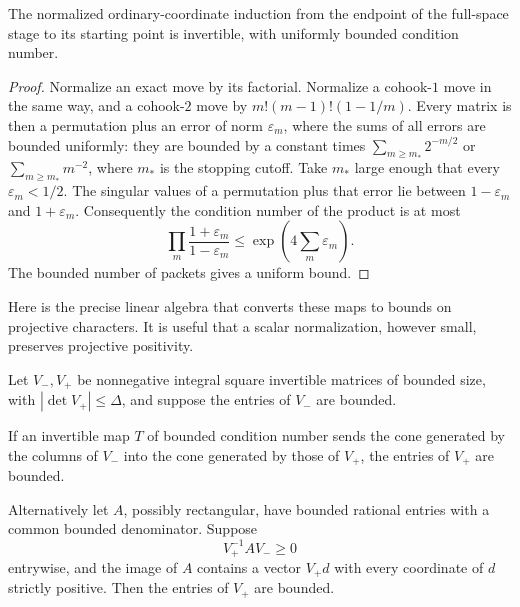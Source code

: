 \begin{lemma}\label{run:condition}
The normalized ordinary-coordinate induction from the endpoint
of the full-space stage to its starting point is invertible,
with uniformly bounded condition number.
\end{lemma}

\begin{proof}
Normalize an exact move by its factorial.  Normalize a
cohook-\(1\) move in the same way, and a cohook-\(2\) move
by \(m!(m-1)!(1-1/m)\).
Every matrix is then a permutation plus an error of norm
\(\varepsilon_m\), where the sums of all errors are bounded
uniformly: they are bounded by a constant times
\(\sum_{m\geq m_*}2^{-m/2}\) or
\(\sum_{m\geq m_*}m^{-2}\), where \(m_*\) is the stopping cutoff.
Take \(m_*\) large enough that every \(\varepsilon_m<1/2\).
The singular values of a permutation plus that error lie
between \(1-\varepsilon_m\) and \(1+\varepsilon_m\).
Consequently the condition number of the product is at most
\[
 \prod_m\frac{1+\varepsilon_m}{1-\varepsilon_m}
 \leq \exp\!\left(4\sum_m\varepsilon_m\right).
 \]
The bounded number of packets gives a uniform bound.
\end{proof}

Here is the precise linear algebra that converts these maps to
bounds on projective characters.  It is useful that a scalar
normalization, however small, preserves projective positivity.

\begin{lemma}\label{run:cone-transfer}
Let \(V_-,V_+\) be nonnegative integral square invertible
matrices of bounded size, with
\(|\det V_+|\leq\Delta\), and suppose the entries of \(V_-\)
are bounded.

If an invertible map \(T\) of bounded condition number sends
the cone generated by the columns of \(V_-\) into the cone
generated by those of \(V_+\), the entries of \(V_+\) are bounded.

Alternatively let \(A\), possibly rectangular, have bounded
rational entries with a common bounded denominator.  Suppose
\[
 V_+^{-1} A V_-\geq0
 \]
entrywise, and the image of \(A\) contains a vector
\(V_+d\) with every coordinate of \(d\) strictly positive.
Then the entries of \(V_+\) are bounded.
\end{lemma}

